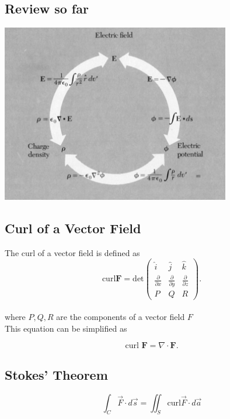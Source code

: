 \documentclass[svgnames]{article}
\begin{document}
\subsection{Review so far} 
\vspace{20px}
\begin{center}
  \includegraphics[width = 10cm]{screenshot 4.png}
\end{center}

\vspace{20px}

\subsection{Curl of a Vector Field}

The curl of a vector field is defined as \[
  \text{curl} \textbf{F} = \text{det} \begin{pmatrix}
    \hat{i} & \hat{j} & \hat{k} \\
    \frac{\partial}{\partial x} & \frac{\partial}{\partial y}
                                & \frac{\partial}{\partial z} \\
    P & Q & R 
  \end{pmatrix}
.\] \\
where $P, Q, R$ are the components of a vector field $F$ \\

This equation can be simplified as 

\[
  \text{curl } \textbf{F} = \nabla \cdot \textbf{F}   
.\] 


\subsection{Stokes' Theorem}

\[ \int_C \vec{F} \cdot d\vec{s} = \iint_S \text{curl} \vec{F} \cdot d\vec{a}
\] \\
\end{document}
